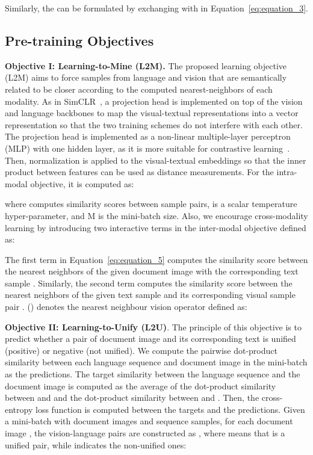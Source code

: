 \documentclass[preprint,review,12pt]{elsarticle}
\begin{document}
Similarly, the  can be formulated by exchanging  with  in Equation~\ref{eq:equation_3}.

\subsection{Pre-training Objectives}


\noindent\textbf{Objective I: Learning-to-Mine (L2M).} The proposed learning objective (L2M) aims to force samples from language and vision that are semantically related to be closer according to the computed nearest-neighbors of each modality. As in SimCLR~\cite{chen2020simple}, a projection head is implemented on top of the vision and language backbones to map the visual-textual representations into a vector representation so that the two training schemes do not interfere with each other. The projection head is implemented as a non-linear multiple-layer perceptron (MLP) with one hidden layer, as it is more suitable for contrastive learning~\cite{chen2020simple}. Then,  normalization is applied to the visual-textual embeddings so that the inner product between features can be used as distance measurements. For the intra-modal objective, it is computed as:

where  computes similarity scores between sample pairs, 
 is a scalar temperature hyper-parameter, and M is the mini-batch size. 
Also, we encourage cross-modality learning by introducing two interactive terms in the inter-modal objective defined as:

The first term in Equation~\ref{eq:equation_5} computes the similarity score between the nearest neighbors of the given document image  with the corresponding text sample . Similarly, the second term computes the similarity score between the nearest neighbors of the given text sample  and its corresponding visual sample pair .
() denotes the nearest neighbour vision operator defined as:

\noindent\textbf{Objective II: Learning-to-Unify (L2U)}. The principle of this objective is to predict whether a pair of document image and its corresponding text is unified (positive) or negative (not unified). We compute the pairwise dot-product similarity between each language sequence  and document image  in the mini-batch as the predictions. The target similarity between the language sequence  and the document image  is computed as the average of the dot-product similarity between  and  and the dot-product similarity between  and . Then, the cross-entropy loss function is computed between the targets and the predictions. Given a mini-batch with  document images and sequence samples, for each document image , the vision-language pairs are constructed as , where  means that  is a unified pair, while  indicates the non-unified ones: 
\end{document}
